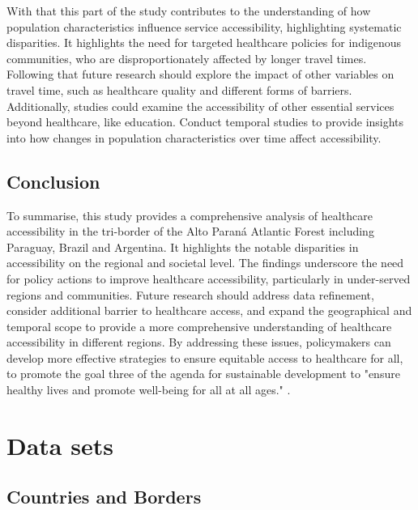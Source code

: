 \documentclass[11pt, a4paper]{report}
\begin{document}
%
With that this part of the study contributes to the understanding of how population characteristics influence service accessibility, highlighting systematic disparities. It highlights the need for targeted healthcare policies for indigenous communities, who are disproportionately affected by longer travel times. \\
%
Following that future research should explore the impact of other variables on travel time, such as healthcare quality and different forms of barriers.
Additionally, studies could examine the accessibility of other essential services beyond healthcare, like education. Conduct temporal studies to provide insights into how changes in population characteristics over time affect accessibility. \\
%

\section{Conclusion}

To summarise, this study provides a comprehensive analysis of healthcare accessibility in the tri-border of the Alto Paraná Atlantic Forest including Paraguay, Brazil and Argentina. It highlights the notable disparities in accessibility on the regional and societal level. The findings underscore the need for policy actions to improve healthcare accessibility, particularly in under-served regions and communities. Future research should address data refinement, consider additional barrier to healthcare access, and expand the geographical and temporal scope to provide a more comprehensive understanding of healthcare accessibility in different regions. By addressing these issues, policymakers can develop more effective strategies to ensure equitable access to healthcare for all, to promote the goal three of the agenda for sustainable development to "ensure healthy lives and promote well-being for all at all ages." \citep{united_nations_transforming_2015}.



\appendix
\renewcommand{\thefigure}{\Alph{chapter}\arabic{figure}}
\setcounter{figure}{0}
\chapter{Data sets} \label{sec:appendix:datasets}

\section{Countries and Borders}
\end{document}
